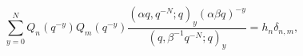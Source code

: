 \[\sum_{y=0}^{N}Q_{n}(q^{-y})Q_{m}(q^{-y})\frac{(\alpha q,q^{-N};q)_{y}(\alpha%
\beta q)^{-y}}{(q,\beta^{-1}q^{-N};q)_{y}}=h_{n}\delta_{n,m},\]
